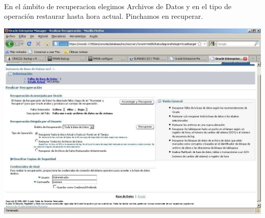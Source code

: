 \begin{enumerate}[1.]
\begin{center}
	\end{center}
	\\En el ámbito de recuperacion elegimos Archivos de Datos y en el tipo de operación restaurar hasta hora actual. Pinchamos en recuperar.
	\begin{center}
	\includegraphics[width=15cm]{./Imagenes/eje8}
	\end{center}
\end{enumerate} 
